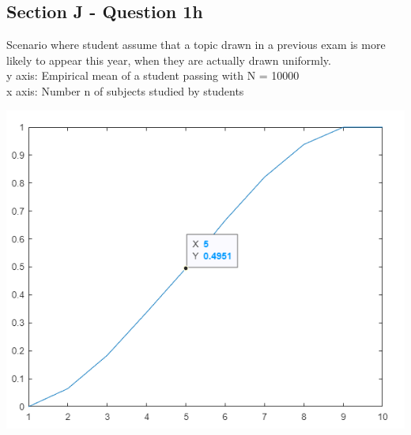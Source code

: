 \documentclass{article}
\begin{document}
\subsection*{Section J - Question 1h}
Scenario where student assume that a topic drawn in a previous exam is more likely
to appear this year, when they are actually drawn uniformly.\\
y axis: Empirical mean of a student passing with N = 10000 \\
x axis: Number n of subjects studied by students
\begin{center}
    \includegraphics[scale=0.5]{p5}
\end{center}
\end{document}
